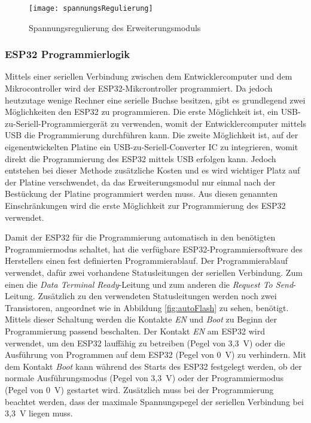 \begin{figure}[h]
    \centering
    \texttt{[image: spannungsRegulierung]}
    \caption{Spannungsregulierung des Erweiterungsmoduls}
    \label{fig:spannungsRegulierung}
\end{figure}

\subsubsection{ESP32 Programmierlogik}
Mittels einer seriellen Verbindung zwischen dem Entwicklercomputer und dem Mikrocontroller wird der ESP32-Mikcrontroller programmiert. Da jedoch heutzutage wenige Rechner eine serielle Buchse besitzen, gibt es grundlegend zwei Möglichkeiten den ESP32 zu programmieren. Die erste Möglichkeit ist, ein USB-zu-Seriell-Programmiergerät zu verwenden, womit der Entwicklercomputer mittels USB die Programmierung durchführen kann. Die zweite Möglichkeit ist, auf der eigenentwickelten Platine ein USB-zu-Seriell-Converter \ac{IC} zu integrieren, womit direkt die Programmierung des ESP32 mittels USB erfolgen kann. Jedoch entstehen bei dieser Methode zusätzliche Kosten und es wird wichtiger Platz auf der Platine verschwendet, da das Erweiterungsmodul nur einmal nach der Bestückung der Platine programmiert werden muss. Aus diesen genannten Einschränkungen wird die erste Möglichkeit zur Programmierung des ESP32 verwendet.

Damit der ESP32 für die Programmierung automatisch in den benötigten Programmiermodus schaltet, hat die verfügbare ESP32-Programmiersoftware des Herstellers einen fest definierten Programmierablauf.  Der Programmierablauf verwendet, dafür zwei vorhandene Statusleitungen der seriellen Verbindung. Zum einen die \textit{Data Terminal Ready}-Leitung und zum anderen die \textit{Request To Send}-Leitung. Zusätzlich zu den verwendeten Statusleitungen werden noch zwei Transistoren, angeordnet wie in Abbildung \ref{fig:autoFlash} zu sehen, benötigt. Mittels dieser Schaltung werden die Kontakte \textit{EN} und \textit{Boot} zu Beginn der Programmierung passend beschalten. Der Kontakt \textit{EN} am ESP32 wird verwendet, um den ESP32 lauffähig zu betreiben (Pegel von 3,3~V) oder die Ausführung von Programmen auf dem ESP32 (Pegel von 0~V) zu verhindern. Mit dem Kontakt \textit{Boot} kann während des Starts des ESP32 festgelegt werden, ob der normale Ausführungsmodus (Pegel von 3,3~V) oder der Programmiermodus (Pegel von 0~V) gestartet wird. Zusätzlich muss bei der Programmierung beachtet werden, dass der maximale Spannungspegel der seriellen Verbindung bei 3,3~V liegen muss. \cite{espFlashTool}

